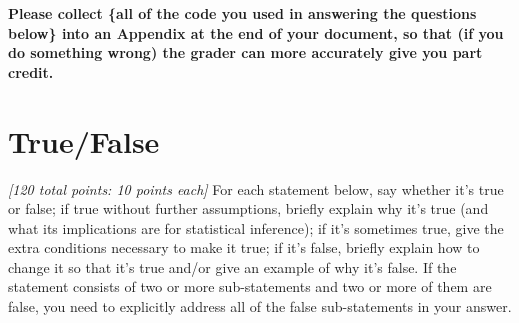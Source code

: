 \documentclass[12pt]{article}
\begin{document}
\textbf{Please collect \{all of the code you used in answering the questions  below\} into an Appendix at the end of your document, so that (if you do something wrong) the grader can more accurately give you part credit.} 

\section{True/False}

\textit{[120 total points: 10 points each]} For each statement below, say whether it's true or false; if true without further assumptions, briefly explain why it's true (and what its implications are for statistical inference); if it's sometimes true, give the extra conditions necessary to make it true; if it's false, briefly explain how to change it so that it's true and/or give an example of why it's false. If the statement consists of two or more sub-statements and two or more of them are false, you need to explicitly address all of the false sub-statements in your answer.
\end{document}
